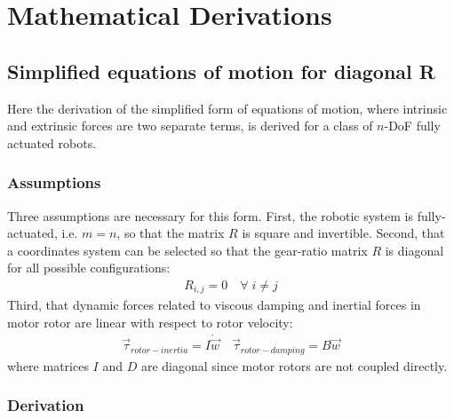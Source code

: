 \chapter{Mathematical Derivations}
\label{sec:proofs}


\section{Simplified equations of motion for diagonal R}
\label{sec:Rdiagndof}

Here the derivation of the simplified form of equations of motion, where intrinsic and extrinsic forces are two separate terms, is derived for a class of $n$-DoF fully actuated robots.

\subsection{Assumptions} 

Three assumptions are necessary for this form. First, the robotic system is fully-actuated, i.e. $m=n$, so that the matrix $R$ is square and invertible. Second, that a coordinates system can be selected so that the gear-ratio matrix $R$ is diagonal for all possible configurations:
%
\begin{align}
R_{i,j} = 0 \quad \forall \; i \neq j
\end{align}
%
Third, that dynamic forces related to viscous damping and inertial forces in motor rotor are linear with respect to rotor velocity:
%
\begin{align}
\vec{\tau}_{rotor-inertia} = I \dot{\vec{w}}  \quad  \vec{\tau}_{rotor-damping} = B \vec{w}
\end{align}
%
where  matrices $I$ and $D$ are diagonal since motor rotors are not coupled directly. 

\subsection{Derivation}

